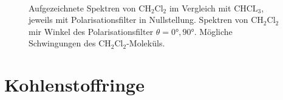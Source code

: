 \documentclass[../bericht.tex]{subfiles}
\begin{document}
\begin{figure}[p]
{
            \label{fig:ch2cl2}
          } \\
          \caption[Aufgezeichnete Spektren von $\mathrm{CH_2Cl_2}$ und mögliche Schwingungen des Moleküls.]{\protect{} Aufgezeichnete Spektren von $\mathrm{CH_2Cl_2}$ im Vergleich mit $\mathrm{CHCL_3}$, jeweils mit Polarisationsfilter in Nullstellung. \protect{} Spektren von $\mathrm{CH_2Cl_2}$ mir Winkel des Polarisationsfilter $\theta=\ang{0},\ang{90}$. \protect{} Mögliche Schwingungen des $\mathrm{CH_2Cl_2}$-Moleküls. \cite{herzberg}}
          \label{fig:ch2cl2-analyse}
        \end{figure}


    \section{Kohlenstoffringe}
\end{document}
